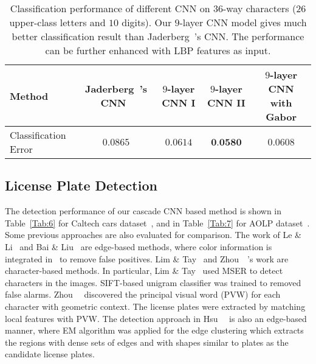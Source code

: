 \documentclass[twocolumn]{svjour3}
\begin{document}
\begin{table*}[ht]
	\begin{center}
	\caption{Classification performance of different CNN on $36$-way characters ($26$ upper-class letters and $10$ digits). Our $9$-layer CNN model gives much better classification result than Jaderberg~\etal's CNN. The performance can be further enhanced with LBP features as input.}
	\label{Tab:5}{
	\begin{tabular}{l|c|c|c|c}
	\hline
	 Method & Jaderberg~\etal's CNN~\cite{Max2014ECCV} & $9$-layer CNN I  & $9$-layer CNN II & $9$-layer CNN with Gabor  \\
	\hline
	 Classification Error & $0.0865$  & $0.0614$ & $\textbf{0.0580}$ & $0.0608$  \\
	\hline
	\end{tabular}
	}

	\end{center}
\end{table*}\subsection{License Plate Detection}
The detection performance of our cascade CNN based method is shown in Table~\ref{Tab:6} for Caltech cars dataset~\cite{carmarkus}, and in Table~\ref{Tab:7} for AOLP dataset~\cite{Hsu2013}. Some previous approaches are also evaluated for comparison. The work of Le \& Li~\cite{Le2006} and Bai \& Liu~\cite{Bai2004} are edge-based methods, where color information is integrated in~\cite{Le2006} to remove false positives. Lim \& Tay~\cite{Wooi2010} and Zhou~\etal~\cite{Zhou2012Principal}'s work are character-based methods. In particular, Lim \& Tay~\cite{Wooi2010} used MSER to detect characters in the images. SIFT-based unigram classifier was trained to removed false alarms. Zhou~\etal~\cite{Zhou2012Principal} discovered the principal visual word (PVW) for each character with geometric context. The license plates were extracted by matching local features with PVW. The detection approach in Hsu~\etal~\cite{Hsu2013} is also an edge-based manner, where EM algorithm was applied for the edge clustering which extracts the regions with dense sets of edges and with shapes similar to plates as the candidate license plates.
\end{document}
